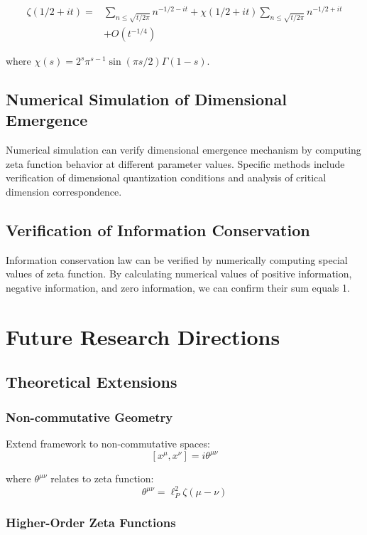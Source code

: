 \documentclass[12pt,a4paper]{article}
\begin{document}
\begin{align}
\zeta(1/2 + it) = &\sum_{n \leq \sqrt{t/2\pi}} n^{-1/2-it} + \chi(1/2+it) \sum_{n \leq \sqrt{t/2\pi}} n^{-1/2+it} \\
&+ O(t^{-1/4})
\end{align}

where $\chi(s) = 2^s \pi^{s-1} \sin(\pi s/2) \Gamma(1-s)$.

\subsection{Numerical Simulation of Dimensional Emergence}

Numerical simulation can verify dimensional emergence mechanism by computing zeta function behavior at different parameter values. Specific methods include verification of dimensional quantization conditions and analysis of critical dimension correspondence.

\subsection{Verification of Information Conservation}

Information conservation law can be verified by numerically computing special values of zeta function. By calculating numerical values of positive information, negative information, and zero information, we can confirm their sum equals 1.

\section{Future Research Directions}

\subsection{Theoretical Extensions}

\subsubsection{Non-commutative Geometry}

Extend framework to non-commutative spaces:
$$[x^{\mu}, x^{\nu}] = i\theta^{\mu\nu}$$

where $\theta^{\mu\nu}$ relates to zeta function:
$$\theta^{\mu\nu} = \ell_P^2 \zeta(\mu - \nu)$$

\subsubsection{Higher-Order Zeta Functions}
\end{document}
